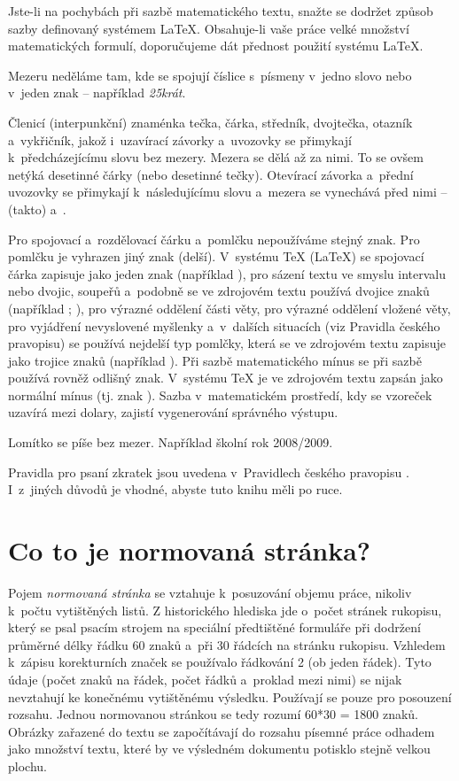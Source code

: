 Jste-li na pochybách při sazbě matematického textu, snažte se dodržet způsob sazby definovaný systémem LaTeX. Obsahuje-li vaše práce velké množství matematických formulí, doporučujeme dát přednost použití systému LaTeX.

Mezeru neděláme tam, kde se spojují číslice s~písmeny v~jedno slovo nebo v~jeden znak -- například {\it 25krát}.

Členicí (interpunkční) znaménka tečka, čárka, středník, dvojtečka, otazník a~vykřičník, jakož i~uzavírací závorky a~uvozovky se přimykají k~předcházejícímu slovu bez mezery. Mezera se dělá až za nimi. To se ovšem netýká desetinné čárky (nebo desetinné tečky). Otevírací závorka a~přední uvozovky se přimykají k~následujícímu slovu a~mezera se vynechává před nimi -- (takto) a~.

Pro spojovací a~rozdělovací čárku a~pomlčku nepoužíváme stejný znak. Pro pomlčku je vyhrazen jiný znak (delší). V~systému TeX (LaTeX) se spojovací čárka zapisuje jako jeden znak  (například ), pro sázení textu ve smyslu intervalu nebo dvojic, soupeřů a~podobně se ve zdrojovém textu používá dvojice znaků  (například ; ), pro výrazné oddělení části věty, pro výrazné oddělení vložené věty, pro vyjádření nevyslovené myšlenky a~v~dalších situacích (viz Pravidla českého pravopisu) se používá nejdelší typ pomlčky, která se ve zdrojovém textu zapisuje jako trojice znaků  (například ). Při sazbě matematického mínus se při sazbě používá rovněž odlišný znak. V~systému TeX je ve zdrojovém textu zapsán jako normální mínus (tj. znak ). Sazba v~matematickém prostředí, kdy se vzoreček uzavírá mezi dolary, zajistí vygenerování správného výstupu.

Lomítko se píše bez mezer. Například školní rok 2008/2009.

Pravidla pro psaní zkratek jsou uvedena v~Pravidlech českého pravopisu \cite{Pravidla}. I~z~jiných důvodů je vhodné, abyste tuto knihu měli po ruce. 


\section{Co to je normovaná stránka?}
Pojem {\it normovaná stránka} se vztahuje k~posuzování objemu práce, nikoliv k~počtu vytištěných listů. Z historického hlediska jde o~počet stránek rukopisu, který se psal psacím strojem na speciální předtištěné formuláře při dodržení průměrné délky řádku 60 znaků a~při 30 řádcích na stránku rukopisu. Vzhledem k~zápisu korekturních značek se používalo řádkování 2 (ob jeden řádek). Tyto údaje (počet znaků na řádek, počet řádků a~proklad mezi nimi) se nijak nevztahují ke konečnému vytištěnému výsledku. Používají se pouze pro posouzení rozsahu. Jednou normovanou stránkou se tedy rozumí 60*30 = 1800 znaků. Obrázky zařazené do textu se započítávají do rozsahu písemné práce odhadem jako množství textu, které by ve výsledném dokumentu potisklo stejně velkou plochu.

